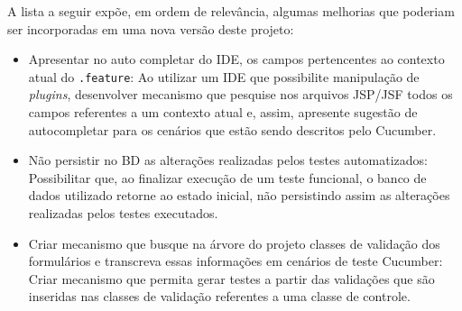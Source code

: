 \documentclass[tg]{mdtufsm}
\begin{document}
A lista a seguir expõe, em ordem de relevância, algumas melhorias que poderiam ser incorporadas em uma nova versão deste projeto:

\begin{itemize}
	\item Apresentar no auto completar do IDE, os campos pertencentes ao contexto atual do \texttt{.feature}: Ao utilizar um IDE que possibilite manipulação de \emph{plugins}, desenvolver mecanismo que pesquise nos arquivos JSP/JSF todos os campos referentes a um contexto atual e, assim, apresente sugestão de autocompletar para os cenários que estão sendo descritos pelo Cucumber.
	\item Não persistir no BD as alterações realizadas pelos testes automatizados: Possibilitar que, ao finalizar execução de um teste funcional, o banco de dados utilizado retorne ao estado inicial, não persistindo assim as alterações realizadas pelos testes executados.
	\item Criar mecanismo que busque na árvore do projeto classes de validação dos formulários e transcreva essas informações em cenários de teste Cucumber: Criar mecanismo que permita gerar testes a partir das validações que são inseridas nas classes de validação referentes a uma classe de controle.
\end{itemize}

\setlength{\baselineskip}{\baselineskip}


\end{document}
